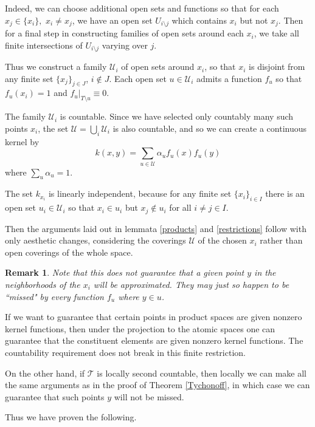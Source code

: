 \documentclass[12pt]{amsart}
\newtheorem{remark}{Remark}[theorem]
\theoremstyle{definition}
\numberwithin{equation}{section}
\begin{document}
Indeed, we can choose additional open sets and functions so that for each $x_j \in \{x_i\},$ $x_i \not = x_j$, we have an open set $U_{i\setminus j}$ which contains $x_i$ but not $x_j$. Then for a final step in constructing families of open sets around each $x_i$, we take all finite intersections of $U_{i\setminus j}$ varying over $j$. 

Thus we construct a family $\mathcal U_i$ of open sets around $x_i$, so that $x_i$ is disjoint from any finite set $\{x_j\}_{j\in J}$, $i\notin J$. Each open set $u \in \mathcal U_i$ admits a function $f_u$ so that $f_u(x_i) =1$ and $f_u|_{T\setminus u}\equiv 0$. 

The family $\mathcal U_i$ is countable. Since we have selected only countably many such points $x_i$, the set  $\mathcal U = \bigcup_i\mathcal U_i$ is also countable, and so we can create a continuous kernel by \[k(x, y)= \sum_{u \in \mathcal U} \alpha_{u}f_{u}(x)f_{u}(y)\]
where $\sum_u\alpha_u = 1$. 

The set $k_{x_i}$ is linearly independent, because for any finite set $\{x_i\}_{i\in I}$ there is an open set $u_i\in \mathcal U_i$ so that $x_i\in u_i$ but $x_j\notin u_i$ for all $i\not= j\in I$. 

Then the arguments laid out in lemmata \ref{products} and \ref{restrictions} follow with only aesthetic changes, considering the coverings $\mathcal U$ of the chosen $x_i$ rather than open coverings of the whole space. 

\begin{remark}
    Note that this does not guarantee that a given point $y$ in the neighborhoods of the $x_i$ will be approximated. They may just so happen to be ``missed" by every function $f_u$ where $y \in u$. 
\end{remark}

If we want to guarantee that certain points in product spaces are given nonzero kernel functions, then under the projection to the atomic spaces one can guarantee that the constituent elements are given nonzero kernel functions. The countability requirement does not break in this finite restriction. 

On the other hand, if $\mathcal T$ is locally second countable, then locally we can make all the same arguments as in the proof of Theorem \ref{Tychonoff}, in which case we can guarantee that such points $y$ will not be missed. 

Thus we have proven the following. 
\end{document}
